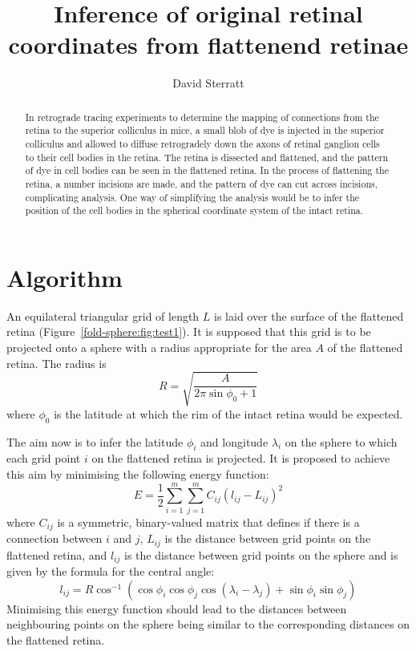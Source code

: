 \documentclass{article}
\title{Inference of original retinal coordinates from  flattenend
  retinae}
\author{David Sterratt}
\begin{document}
\maketitle

\begin{abstract}
  In retrograde tracing experiments to determine the mapping of
  connections from the retina to the superior colliculus in mice, a
  small blob of dye is injected in the superior colliculus and allowed
  to diffuse retrogradely down the axons of retinal ganglion cells to
  their cell bodies in the retina. The retina is dissected and
  flattened, and the pattern of dye in cell bodies can be seen in the
  flattened retina.  In the process of flattening the retina, a number
  incisions are made, and the pattern of dye can cut across incisions,
  complicating analysis.  One way of simplifying the analysis would be
  to infer the position of the cell bodies in the spherical coordinate
  system of the intact retina.  
\end{abstract}

\section{Algorithm}
\label{fold-retina:sec:method}

An equilateral triangular grid of length $L$ is laid over the surface
of the flattened retina (Figure~\ref{fold-sphere:fig:test1}).  It is
supposed that this grid is to be projected onto a sphere with a radius
appropriate for the area $A$ of the flattened retina. The radius is
\begin{equation}
  \label{fold-sphere:eq:1}
  R = \sqrt{\frac{A}{2\pi\sin\phi_0+1}}
\end{equation}
where $\phi_0$ is the latitude at which the rim of the intact retina
would be expected.

The aim now is to infer the latitude $\phi_i$ and longitude
$\lambda_i$ on the sphere to which each grid point $i$ on the
flattened retina is projected.  It is proposed to achieve this aim by
minimising the following energy function:
\begin{equation}
  E  = \frac{1}{2} \sum_{i=1}^m \sum_{j=1}^m C_{ij} (l_{ij}-L_{ij})^2
\end{equation}
where $C_{ij}$ is a symmetric, binary-valued matrix that defines if
there is a connection between $i$ and $j$, $L_{ij}$ is the distance
between grid points on the flattened retina, and $l_{ij}$ is the
distance between grid points on the sphere and is given by the formula
for the central angle:
\begin{equation}
  \label{fold-sphere:eq:2}
  l_{ij} = R\cos^{-1}(\cos\phi_i\cos\phi_j\cos(\lambda_i-\lambda_j) + \sin\phi_i\sin\phi_j)
\end{equation}
Minimising this energy function should lead to the distances between
neighbouring points on the sphere being similar to the corresponding
distances on the flattened retina.
\end{document}

